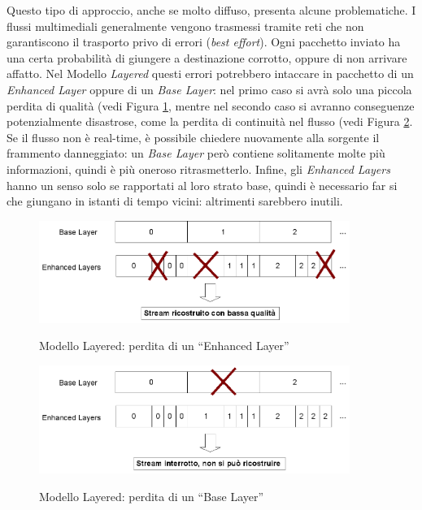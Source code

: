 Questo tipo di approccio, anche se molto diffuso, presenta alcune problematiche.
I flussi multimediali generalmente vengono trasmessi tramite reti che non
garantiscono il trasporto privo di errori (\emph{best effort}). Ogni pacchetto
inviato ha una certa probabilità di giungere a destinazione corrotto, oppure di
non arrivare affatto. Nel Modello \emph{Layered} questi errori potrebbero
intaccare in pacchetto di un \emph{Enhanced Layer} oppure di un \emph{Base
Layer}: nel primo caso si avrà solo una piccola perdita di qualità (vedi Figura
\ref{fig:modello_layered_errori1}, mentre nel secondo caso si avranno
conseguenze potenzialmente disastrose, come la perdita di continuità nel flusso
(vedi Figura \ref{fig:modello_layered_errori2}. Se il flusso non è real-time, è
possibile chiedere nuovamente alla sorgente il frammento danneggiato: un \emph{Base Layer} però contiene solitamente molte più informazioni, quindi è più oneroso ritrasmetterlo.
Infine, gli \emph{Enhanced Layers} hanno un senso solo se rapportati al loro
strato base, quindi è necessario far si che giungano in istanti di tempo vicini:
altrimenti sarebbero inutili.

\begin{figure}[h]
\includegraphics[width=0.90\textwidth]{../images/modello_layered_errori1.png}
\label{fig:modello_layered_errori1}
\caption{Modello Layered: perdita di un ``Enhanced Layer''}
\end{figure}

\begin{figure}[h]
\includegraphics[width=0.90\textwidth]{../images/modello_layered_errori2.png}
\label{fig:modello_layered_errori2}
\caption{Modello Layered: perdita di un ``Base Layer''}
\end{figure}


